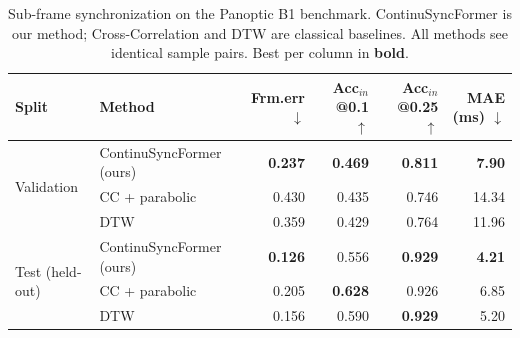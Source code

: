 %

\begin{table}[t]
\centering
\caption{Sub-frame synchronization on the Panoptic B1 benchmark. ContinuSyncFormer
is our method; Cross-Correlation and DTW are classical baselines. All methods see
identical sample pairs. Best per column in \textbf{bold}.}
\label{tab:b1_main}
\begin{tabular}{llrrrr}
\toprule
Split & Method & Frm.err $\downarrow$ & Acc$_{in}$@0.1 $\uparrow$ & Acc$_{in}$@0.25 $\uparrow$ & MAE (ms) $\downarrow$ \\
\midrule
\multirow{3}{*}{Validation}
 & ContinuSyncFormer (ours) & \textbf{0.237} & \textbf{0.469} & \textbf{0.811} & \textbf{7.90} \\
 & CC + parabolic           & 0.430 & 0.435 & 0.746 & 14.34 \\
 & DTW                      & 0.359 & 0.429 & 0.764 & 11.96 \\
\midrule
\multirow{3}{*}{Test (held-out)}
 & ContinuSyncFormer (ours) & \textbf{0.126} & 0.556 & \textbf{0.929} & \textbf{4.21} \\
 & CC + parabolic           & 0.205 & \textbf{0.628} & 0.926 & 6.85 \\
 & DTW                      & 0.156 & 0.590 & \textbf{0.929} & 5.20 \\
\bottomrule
\end{tabular}
\end{table}

